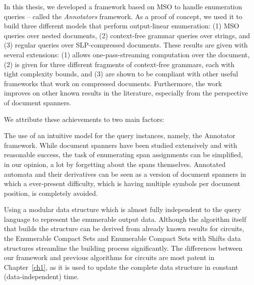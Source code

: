 In this thesis, we developed a framework based on MSO to handle enumeration queries -- called the {\em Annotators} framework. As a proof of concept, we used it to build three different models that perform output-linear enumeration: (1) MSO queries over nested documents, (2) context-free grammar queries over strings, and (3) regular queries over SLP-compressed documents. These results are given with several extensions: (1) allows one-pass-streaming computation over the document, (2) is given for three different fragments of context-free grammars, each with tight complexity bounds, and (3) are shown to be compliant with other useful frameworks that work on compressed documents. Furthermore, the work improves on other known results in the literature, especially from the perspective of document spanners.

We attribute these achievements to two main factors:

The use of an intuitive model for the query instances, namely, the Annotator framework. While document spanners have been studied extensively and with reasonable success, the task of enumerating span assignments can be simplified, in our opinion, a lot by forgetting about the spans themselves. Annotated automata and their derivatives can be seen as a version of document spanners in which a ever-present difficulty, which is having multiple symbols per document position, is completely avoided.

Using a modular data structure which is almost fully independent to the query language to represent the enumerable output data. Although the algorithm itself that builds the structure can be derived from already known results for circuits, the Enumerable Compact Sets and Enumerable Compact Sets with Shifts data structures streamline the building process significantly. The differences between our framework and previous algorithms for circuits are most patent in Chapter~\ref{ch1}, as it is used to update the complete data structure in constant (data-independent) time.
